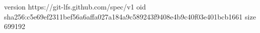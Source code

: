 version https://git-lfs.github.com/spec/v1
oid sha256:c5e69ef2311bef56a6affa027a184a9c589243f9408e4b9c40f03e401bcb1661
size 699192
